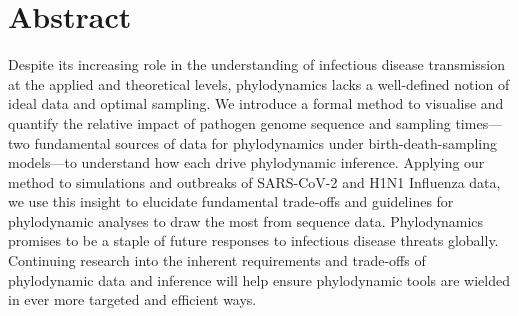 \documentclass{article}
\begin{document}
\section*{Abstract}Despite its increasing role in the understanding of infectious disease transmission at the applied and theoretical levels, phylodynamics lacks a well-defined notion of ideal data and optimal sampling. We introduce a formal method to visualise and quantify the relative impact of pathogen genome sequence and sampling times---two fundamental sources of data for phylodynamics under birth-death-sampling models---to understand how each drive phylodynamic inference. Applying our method to simulations and outbreaks of SARS-CoV-2 and H1N1 Influenza data, we use this insight to elucidate fundamental trade-offs and guidelines for phylodynamic analyses to draw the most from sequence data. Phylodynamics promises to be a staple of future responses to infectious disease threats globally. Continuing research into the inherent requirements and trade-offs of phylodynamic data and inference will help ensure phylodynamic tools are wielded in ever more targeted and efficient ways.
\end{document}
